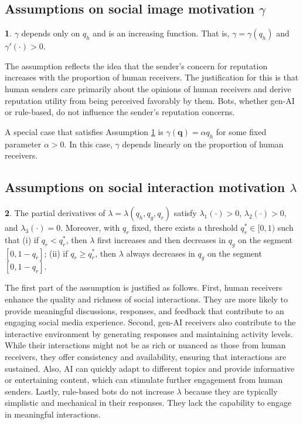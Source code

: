 \documentclass[english,12pt]{article}
\theoremstyle{plain}
\theoremstyle{plain}
\theoremstyle{definition}
\theoremstyle{definition}
\theoremstyle{assumption}
\newtheorem{assumption}{\protect\assumptionname}
\theoremstyle{plain}
\theoremstyle{plain}
\theoremstyle{plain}
\theoremstyle{plain}
\theoremstyle{definition}%
\theoremstyle{plain}
\theoremstyle{plain}
\theoremstyle{plain}
\theoremstyle{plain}
\theoremstyle{plain}
\providecommand{\assumptionname}{Assumption}
\begin{document}
\subsection{Assumptions on social image motivation $\gamma$}


\begin{assumption}\label{assumption:gamma}
    $\gamma$ depends only on $q_h$ and is an increasing function. That is, $\gamma=\gamma(q_h)$ and $\gamma'(\cdot)>0$.
\end{assumption}

The assumption reflects the idea that the sender's concern for reputation increases with the proportion of human receivers. The justification for this is that human senders care primarily about the opinions of human receivers and derive reputation utility from being perceived favorably by them. Bots, whether gen-AI or rule-based, do not influence the sender's reputation concerns.

A special case that satisfies Assumption \ref{assumption:gamma} is $\gamma(\bm{q}) = \alpha q_h$ for some fixed parameter $\alpha>0$. In this case, $\gamma$ depends linearly on the proportion of human receivers.


\subsection{Assumptions on social interaction motivation $\lambda$}

\begin{assumption}\label{assumption:lambda}
    The partial derivatives of $\lambda=\lambda(q_h,q_g,q_r)$ satisfy $\lambda_1(\cdot)>0$, $\lambda_2(\cdot)>0$, and $\lambda_3(\cdot)=0$. Moreover, with $q_r$ fixed, there exists a threshold $q_r^*\in [0,1)$ such that (i) if $q_r<q_r^*$, then $\lambda$ first increases and then decreases in $q_g$ on the segment $[0,1-q_r]$; (ii) if $q_r\geq q_r^*$, then $\lambda$ always decreases in $q_g$ on the segment $[0,1-q_r]$.
\end{assumption}

The first part of the assumption is justified as follows. First, human receivers enhance the quality and richness of social interactions. They are more likely to provide meaningful discussions, responses, and feedback that contribute to an engaging social media experience. Second, gen-AI receivers also contribute to the interactive environment by generating responses and maintaining activity levels. While their interactions might not be as rich or nuanced as those from human receivers, they offer consistency and availability, ensuring that interactions are sustained. Also, AI can quickly adapt to different topics and provide informative or entertaining content, which can stimulate further engagement from human senders. Lastly, rule-based bots do not increase $\lambda$ because they are typically simplistic and mechanical in their responses. They lack the capability to engage in meaningful interactions. 
\end{document}
